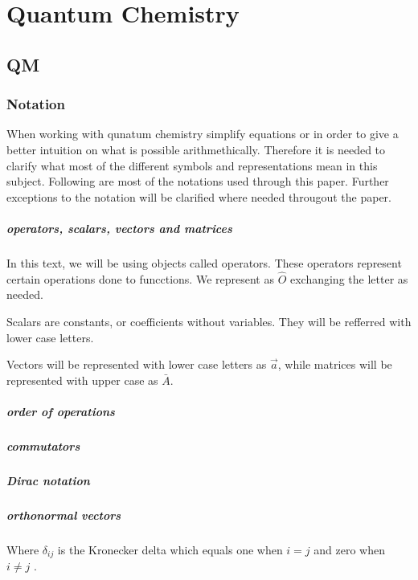 \documentclass[../master_thesis.tex]{subfiles}
\begin{document}
\chapter{Quantum Chemistry}
\section{\ac{QM}}
\subsection{Notation}
When working with qunatum chemistry simplify equations or in order to give a
better intuition on what is possible arithmethically. Therefore it is needed to
clarify what most of the different symbols and representations mean in this
subject. Following are most of the notations used through this paper. Further exceptions to the notation will be
clarified where needed througout the paper.
\paragraph{operators, scalars, vectors and matrices}
In this text, we will be using objects called operators. These operators represent
certain operations done to funcctions. We represent as $\hat{O}$ exchanging the letter
as needed.

Scalars are constants, or coefficients without variables. They will be refferred with
lower case letters.

Vectors will be represented with lower case letters as $\vec{a}$, while
matrices will be represented with upper case as $\bar{A}$.
\paragraph{order of operations}

\paragraph{commutators}

\paragraph{Dirac notation}

\paragraph{orthonormal vectors}

Where $\delta_{ij}$ is the Kronecker delta which equals one when $i = j$ and
zero when $ i \neq j$ \cite{ Atkins:2014, Atkins:2011, Cohen:1973, Cramer:2004, Jensen:2017}.
\end{document}
